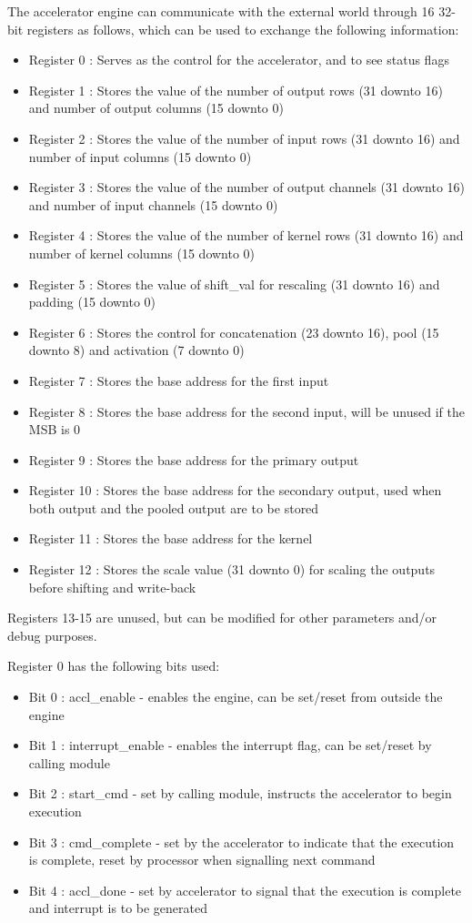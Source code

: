 \documentclass[a4paper,12pt, final]{report}
\begin{document}
The accelerator engine can communicate with the external world through 16 32-bit registers as follows, which can be used to exchange the following information:

\begin{itemize}
	\item Register 0 : Serves as the control for the accelerator, and to see status flags
	\item Register 1 : Stores the value of the number of output rows (31 downto 16) and number of output columns (15 downto 0)
	\item Register 2 : Stores the value of the number of input rows (31 downto 16) and number of input columns (15 downto 0)
	\item Register 3 : Stores the value of the number of output channels (31 downto 16) and number of input channels (15 downto 0)
	\item Register 4 : Stores the value of the number of kernel rows (31 downto 16) and number of kernel columns (15 downto 0)
	\item Register 5 : Stores the value of shift\_val for rescaling (31 downto 16) and padding (15 downto 0)
	\item Register 6 : Stores the control for concatenation (23 downto 16), pool (15 downto 8) and activation (7 downto 0)
	\item Register 7 : Stores the base address for the first input
	\item Register 8 : Stores the base address for the second input, will be unused if the MSB is 0
	\item Register 9 : Stores the base address for the primary output
	\item Register 10 : Stores the base address for the secondary output, used when both output and the pooled output are to be stored
	\item Register 11 : Stores the base address for the kernel
	\item Register 12 : Stores the scale value (31 downto 0) for scaling the outputs before shifting and write-back
\end{itemize}

Registers 13-15 are unused, but can be modified for other parameters and/or debug purposes.

Register 0 has the following bits used:
\begin{itemize}
	\item Bit 0 : accl\_enable - enables the engine, can be set/reset from outside the engine
	\item Bit 1 : interrupt\_enable - enables the interrupt flag,  can be set/reset by calling module
	\item Bit 2 : start\_cmd - set by calling module, instructs the accelerator to begin execution
	\item Bit 3 : cmd\_complete - set by the accelerator to indicate that the execution is complete, reset by processor when signalling next command
	\item Bit 4 : accl\_done - set by accelerator to signal that the execution is complete and interrupt is to be generated
\end{itemize}
\end{document}
